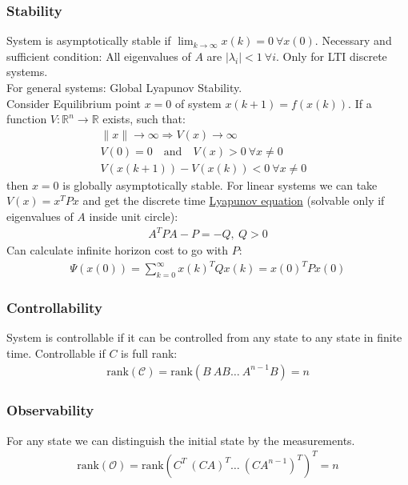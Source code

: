 \documentclass[a4paper,landscape,8pt,fleqn]{scrartcl}
\newcommand{\mc}[1]{\mathcal{#1}}
\begin{document}
\begin{multicols}{3}
\subsubsection{Stability}
System is asymptotically stable if $\lim_{k\rightarrow \infty} x(k) = 0 ~\forall x(0)$. Necessary and sufficient condition: All eigenvalues of $A$ are $|\lambda_i| < 1 ~\forall i$. Only for LTI discrete systems. \\
For general systems: Global Lyapunov Stability.\\
Consider Equilibrium point $x=0$ of system $x(k+1) = f(x(k))$. If a function $V: \mathbb{R}^n \rightarrow \mathbb{R}$ exists, such that:
\begin{align*}
	\|x\| \rightarrow \infty \Rightarrow V(x) \rightarrow \infty& \\
	V(0) = 0 \mathrm{\quad and \quad} V(x) > 0 ~\forall x \neq 0& \\
	V(x(k+1)) - V(x(k)) < 0 ~\forall x \neq 0
\end{align*}
then $x=0$ is globally asymptotically stable. For linear systems we can take $V(x) = x^T P x$ and get the discrete time \underline{Lyapunov equation} (solvable only if eigenvalues of $A$ inside unit circle):
\begin{align*}
	A^T P A - P = - Q, ~ Q>0
\end{align*}
Can calculate infinite horizon cost to go with $P$:
\begin{align*}
	\Psi(x(0)) = \sum_{k=0}^\infty x(k)^T Q x(k) = x(0)^T P x(0)
\end{align*}
\subsubsection{Controllability}
System is controllable if it can be controlled from any state to any state in finite time. Controllable if $C$ is full rank:
\begin{align*}
	\mathrm{rank}(\mc{C}) = \mathrm{rank}\left(B ~AB \dots ~A^{n-1}B\right) = n
\end{align*}
\subsubsection{Observability}
For any state we can distinguish the initial state by the measurements.
\begin{align*}
	\mathrm{rank}(\mc{O}) = \mathrm{rank}\left(C^T ~(CA)^T \dots~(CA^{n-1})^T\right)^T = n
\end{align*}

\end{multicols}
\end{document}

